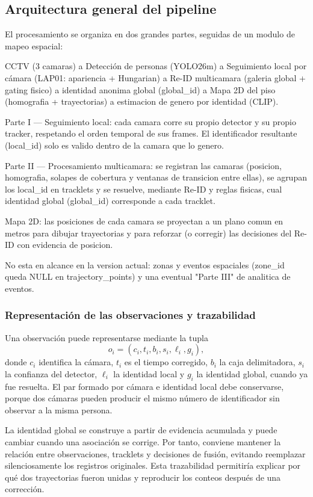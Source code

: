 \documentclass[12pt,letterpaper]{article}
\begin{document}
\subsection{Arquitectura general del pipeline}

El procesamiento se organiza en dos grandes partes, seguidas de un modulo de mapeo espacial:


CCTV (3 camaras)   a   Detección de personas (YOLO26m)   a   Seguimiento local por cámara (LAP01: apariencia + Hungarian)   a   Re-ID multicamara (galeria global + gating fisico)   a   identidad anonima global (global\_id)   a   Mapa 2D del piso (homografia + trayectorias)   a   estimacion de genero por identidad (CLIP).


Parte I — Seguimiento local: cada camara corre su propio detector y su propio tracker, respetando el orden temporal de sus frames. El identificador resultante (local\_id) solo es valido dentro de la camara que lo genero.


Parte II — Procesamiento multicamara: se registran las camaras (posicion, homografia, solapes de cobertura y ventanas de transicion entre ellas), se agrupan los local\_id en tracklets y se resuelve, mediante Re-ID y reglas fisicas, cual identidad global (global\_id) corresponde a cada tracklet.


Mapa 2D: las posiciones de cada camara se proyectan a un plano comun en metros para dibujar trayectorias y para reforzar (o corregir) las decisiones del Re-ID con evidencia de posicion.


No esta en alcance en la version actual: zonas y eventos espaciales (zone\_id queda NULL en trajectory\_points) y una eventual "Parte III" de analitica de eventos.


\subsubsection{Representación de las observaciones y trazabilidad}
Una observación puede representarse mediante la tupla
\[
 o_i=(c_i,t_i,b_i,s_i,\ell_i,g_i),
\]
donde $c_i$ identifica la cámara, $t_i$ es el tiempo corregido, $b_i$ la caja delimitadora, $s_i$ la confianza del detector, $\ell_i$ la identidad local y $g_i$ la identidad global, cuando ya fue resuelta. El par formado por cámara e identidad local debe conservarse, porque dos cámaras pueden producir el mismo número de identificador sin observar a la misma persona.

La identidad global se construye a partir de evidencia acumulada y puede cambiar cuando una asociación se corrige. Por tanto, conviene mantener la relación entre observaciones, tracklets y decisiones de fusión, evitando reemplazar silenciosamente los registros originales. Esta trazabilidad permitiría explicar por qué dos trayectorias fueron unidas y reproducir los conteos después de una corrección.
\end{document}
